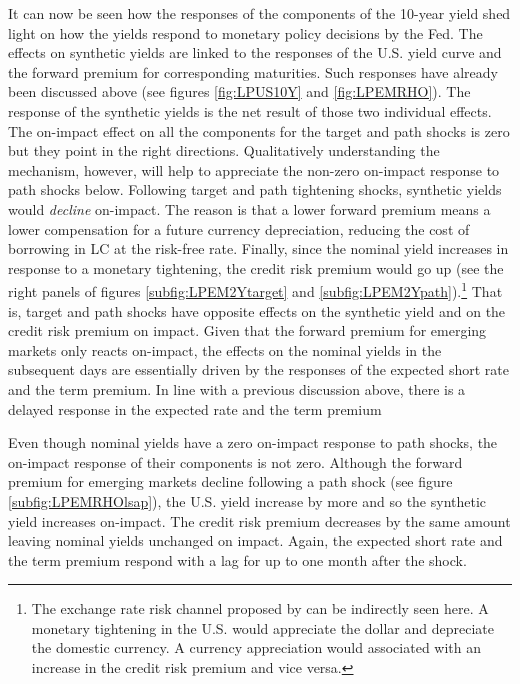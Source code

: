 {It can now be seen how the responses of the components of the 10-year yield shed light on how the yields respond to monetary policy decisions by the Fed.
The effects on synthetic yields are linked to the responses of the U.S. yield curve and the forward premium for corresponding maturities.
Such responses have already been discussed above (see figures \ref{fig:LPUS10Y} and \ref{fig:LPEMRHO}).
The response of the synthetic yields is the net result of those two individual effects.
The on-impact effect on all the components for the target and path shocks is zero but they point in the right directions.
Qualitatively understanding the mechanism, however, will help to appreciate the non-zero on-impact response to path shocks below.
Following target and path tightening shocks, synthetic yields would \textit{decline} on-impact.
The reason is that a lower forward premium means a lower compensation for a future currency depreciation, reducing the cost of borrowing in LC at the risk-free rate.
Finally, since the nominal yield increases in response to a monetary tightening, the credit risk premium would go up (see the right panels of figures \ref{subfig:LPEM2Ytarget} and \ref{subfig:LPEM2Ypath}).\footnote{ The exchange rate risk channel proposed by \cite{HofmannShimShin:2019} can be indirectly seen here. A monetary tightening in the U.S. would appreciate the dollar and depreciate the domestic currency. A currency appreciation would associated with an increase in the credit risk premium and vice versa.}
That is, target and path shocks have opposite effects on the synthetic yield and on the credit risk premium on impact.
Given that the forward premium for emerging markets only reacts on-impact, the effects on the nominal yields in the subsequent days are essentially driven by the responses of the expected short rate and the term premium.
In line with a previous discussion above, there is a delayed response in the expected rate and the term premium

Even though nominal yields have a zero on-impact response to path shocks, the on-impact response of their components is not zero.
Although the forward premium for emerging markets decline following a path shock (see figure \ref{subfig:LPEMRHOlsap}), the U.S. yield increase by more and so the synthetic yield increases on-impact.
The credit risk premium decreases by the same amount leaving nominal yields unchanged on impact.
Again, the expected short rate and the term premium respond with a lag for up to one month after the shock.

}

